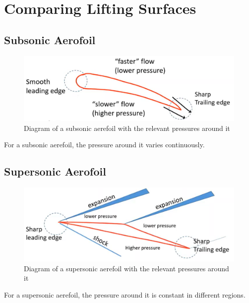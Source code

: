 \documentclass[class=report, crop=false, 12pt,a4paper]{standalone}
\begin{document}
\section{Comparing Lifting Surfaces}
\subsection{Subsonic Aerofoil}
\begin{figure}[H]
    \centering
    \includegraphics[width = 0.9 \textwidth]{../img/diagram30.png}
    \caption{Diagram of a subsonic aerefoil with the relevant pressures around it}
\end{figure}
For a subsonic aerefoil, the pressure around it varies continuously. 
\subsection{Supersonic Aerofoil}
\begin{figure}[H]
    \centering
    \includegraphics[width = 0.9 \textwidth]{../img/diagram31.png}
    \caption{Diagram of a supersonic aerefoil with the relevant pressures around it}
\end{figure}
For a supersonic aerefoil, the pressure around it is constant in different regions. 
\end{document}

